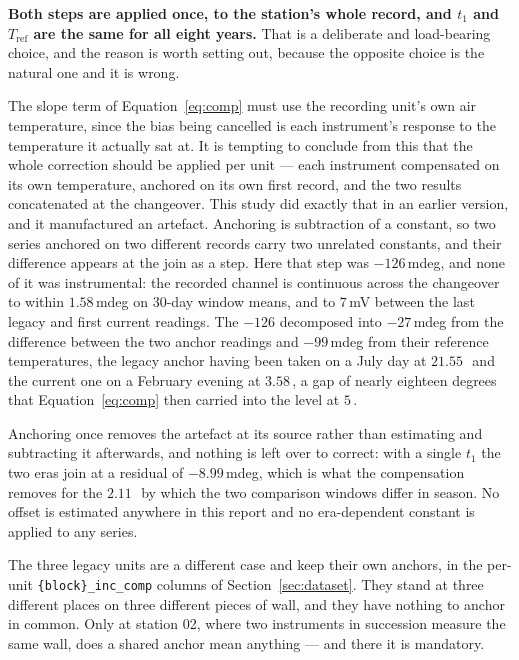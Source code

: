\documentclass[11pt,a4paper]{article}
\begin{document}
\textbf{Both steps are applied once, to the station's whole record, and $t_1$ and $T_{\mathrm{ref}}$ are the same for all eight years.} That is a deliberate and load-bearing choice, and the reason is worth setting out, because the opposite choice is the natural one and it is wrong.

The slope term of Equation~\eqref{eq:comp} must use the recording unit's own air temperature, since the bias being cancelled is each instrument's response to the temperature it actually sat at. It is tempting to conclude from this that the whole correction should be applied per unit --- each instrument compensated on its own temperature, anchored on its own first record, and the two results concatenated at the changeover. This study did exactly that in an earlier version, and it manufactured an artefact. Anchoring is subtraction of a constant, so two series anchored on two different records carry two unrelated constants, and their difference appears at the join as a step. Here that step was $-126$\,mdeg, and none of it was instrumental: the recorded channel is continuous across the changeover to within $1.58$\,mdeg on 30-day window means, and to $7$\,mV between the last legacy and first current readings. The $-126$ decomposed into $-27$\,mdeg from the difference between the two anchor readings and $-99$\,mdeg from their reference temperatures, the legacy anchor having been taken on a July day at $21.55$\,\degC\ and the current one on a February evening at $3.58$\,\degC, a gap of nearly eighteen degrees that Equation~\eqref{eq:comp} then carried into the level at $5$\,\mdegC.

Anchoring once removes the artefact at its source rather than estimating and subtracting it afterwards, and nothing is left over to correct: with a single $t_1$ the two eras join at a residual of $-8.99$\,mdeg, which is what the compensation removes for the $2.11$\,\degC\ by which the two comparison windows differ in season. No offset is estimated anywhere in this report and no era-dependent constant is applied to any series.

The three legacy units are a different case and keep their own anchors, in the per-unit \texttt{\{block\}\_inc\_comp} columns of Section~\ref{sec:dataset}. They stand at three different places on three different pieces of wall, and they have nothing to anchor in common. Only at station 02, where two instruments in succession measure the same wall, does a shared anchor mean anything --- and there it is mandatory.
\end{document}
